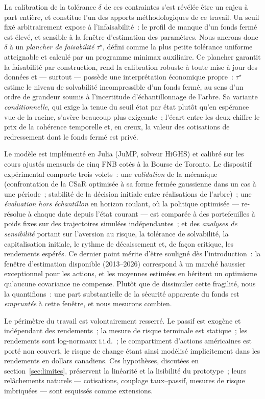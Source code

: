 \documentclass[11pt,letterpaper]{article}
\newcommand{\taustar}{\tau^{\star}}
\theoremstyle{definition}
\begin{document}
La calibration de la tolérance $\delta$ de ces contraintes s'est révélée être un
enjeu à part entière, et constitue l'un des apports méthodologiques de ce travail.
Un seuil fixé arbitrairement expose à l'infaisabilité~: le profil de manque d'un
fonds fermé est élevé, et sensible à la fenêtre d'estimation des paramètres. Nous
ancrons donc $\delta$ à un \emph{plancher de faisabilité} $\taustar$, défini comme
la plus petite tolérance uniforme atteignable et calculé par un programme minimax
auxiliaire. Ce plancher garantit la faisabilité par construction, rend la
calibration robuste à toute mise à jour des données et --- surtout --- possède une
interprétation économique propre~: $\taustar$ estime le niveau de solvabilité
incompressible d'un fonds fermé, au sens d'un ordre de grandeur soumis à
l'incertitude d'échantillonnage de l'arbre. Sa variante \emph{conditionnelle}, qui exige la
tenue du seuil état par état plutôt qu'en espérance vue de la racine, s'avère
beaucoup plus exigeante~; l'écart entre les deux chiffre le prix de la cohérence
temporelle et, en creux, la valeur des cotisations de redressement dont le fonds
fermé est privé.

Le modèle est implémenté en Julia (JuMP, solveur HiGHS) et calibré sur les cours
ajustés mensuels de cinq FNB cotés à la Bourse de Toronto. Le dispositif
expérimental comporte trois volets~: une \emph{validation} de la mécanique
(confrontation de la CSaR optimisée à sa forme fermée gaussienne dans un cas à une
période~; stabilité de la décision initiale entre réalisations de l'arbre)~; une
\emph{évaluation hors échantillon} en horizon roulant, où la politique optimisée ---
re-résolue à chaque date depuis l'état courant --- est comparée à des portefeuilles
à poids fixes sur des trajectoires simulées indépendantes~; et des \emph{analyses de
sensibilité} portant sur l'aversion au risque, la tolérance de solvabilité, la
capitalisation initiale, le rythme de décaissement et, de façon critique, les
rendements espérés. Ce dernier point mérite d'être souligné dès l'introduction~: la
fenêtre d'estimation disponible (2013--2026) correspond à un marché haussier
exceptionnel pour les actions, et les moyennes estimées en héritent un optimisme
qu'aucune covariance ne compense. Plutôt que de dissimuler cette fragilité, nous la
quantifions~: une part substantielle de la sécurité apparente du fonds est
\emph{empruntée} à cette fenêtre, et nous mesurons combien.

Le périmètre du travail est volontairement resserré. Le passif est exogène et
indépendant des rendements~; la mesure de risque terminale est statique~; les
rendements sont log-normaux i.i.d.~; le compartiment d'actions américaines est porté
non couvert, le risque de change étant ainsi modélisé implicitement dans les
rendements en dollars canadiens. Ces
hypothèses, discutées en section~\ref{sec:limites}, préservent la linéarité et la
lisibilité du prototype~; leurs relâchements naturels --- cotisations, couplage
taux--passif, mesures de risque imbriquées --- sont esquissés comme extensions.
\end{document}
